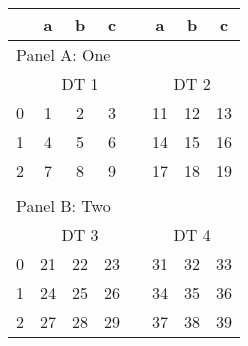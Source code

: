 \begin{table}
\centering
\begin{threeparttable}
\caption{}
\begin{tabular}{lccccccc}
\toprule
  & a & b & c &   & a & b & c\\
\midrule
\multicolumn{8}{l}{Panel A: One}\\
  & \multicolumn{3}{c}{DT 1} &   & \multicolumn{3}{c}{DT 2}\\
\cmidrule(lr){2-4} \cmidrule(lr){6-8}
0 & 1 & 2 & 3  &   & 11 & 12 & 13 \\
1 & 4 & 5 & 6  &   & 14 & 15 & 16 \\
2 & 7 & 8 & 9  &   & 17 & 18 & 19 \\
  &   &   &   &   &   &   &  \\
\multicolumn{8}{l}{Panel B: Two}\\
  & \multicolumn{3}{c}{DT 3} &   & \multicolumn{3}{c}{DT 4}\\
\cmidrule(lr){2-4} \cmidrule(lr){6-8}
0 & 21 & 22 & 23  &   & 31 & 32 & 33 \\
1 & 24 & 25 & 26  &   & 34 & 35 & 36 \\
2 & 27 & 28 & 29  &   & 37 & 38 & 39 \\
\bottomrule

\end{tabular}
\end{threeparttable}
\end{table}